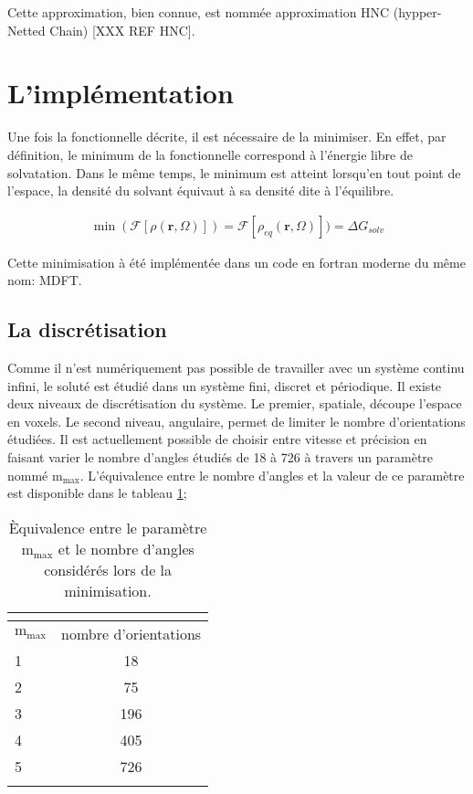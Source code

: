 Cette approximation, bien connue, est nommée approximation HNC (hypper-Netted Chain) [XXX REF HNC]. 


\section{L'implémentation}
Une fois la fonctionnelle décrite, il est nécessaire de la minimiser. En effet, par définition, le minimum de la fonctionnelle correspond à l'énergie libre de solvatation. Dans le même temps, le minimum est atteint lorsqu'en tout point de l'espace, la densité du solvant équivaut à sa densité dite à l'équilibre.

\begin{eqnarray}
\min(\mathcal{F}[\rho\left(\boldsymbol{r},\Omega \right)]) = \mathcal{F}[\rho_{eq}\left(\boldsymbol{r},\Omega \right)])= \Delta G_{solv}
\end{eqnarray}

Cette minimisation à été implémentée dans un code en fortran moderne du même nom: MDFT.


\subsection{La discrétisation}
Comme il n'est numériquement pas possible de travailler avec un système continu infini, le soluté est étudié dans un système fini, discret et périodique. Il existe deux niveaux de discrétisation du système. Le premier, spatiale, découpe l'espace en voxels. Le second niveau, angulaire\cite{ding_cea-01564512}, permet de limiter le nombre d'orientations étudiées. Il est actuellement possible de choisir entre vitesse et précision en faisant varier le nombre d'angles étudiés de 18 à 726 à travers un paramètre nommé $\mathrm{m}_\mathrm{max}$. L'équivalence entre le nombre d'angles et la valeur de ce paramètre est disponible dans le tableau \ref{tab:mmax};

\begin{table}[H]
 \centering
  \begin{tabular}{l | c }
    \hline \multicolumn{2}{c}{} \\[-1em]\hline
    $\mathrm{m}_\mathrm{max}$ & nombre d'orientations \\
    \hline
    1  & 18 \\
    2  & 75 \\
    3  & 196 \\
    4  & 405 \\
    5  & 726 \\
    \hline \multicolumn{2}{c}{} \\[-1em]\hline
  \end{tabular}
  \caption[\`Equivalence entre le paramètre $\mathrm{m}_\mathrm{max}$ et le nombre d'angles.]{\`Equivalence entre le paramètre $\mathrm{m}_\mathrm{max}$ et le nombre d'angles considérés lors de la minimisation.}
  \label{tab:mmax}  
\end{table}


